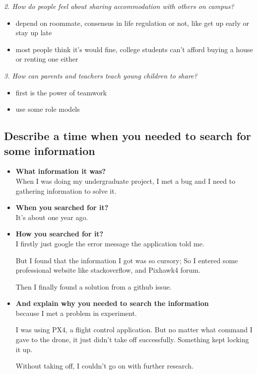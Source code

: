 \documentclass[conference]{IEEEtran}
\begin{document}
\textit{2. How do people feel about sharing accommodation with others on campus?}
\begin{itemize}
    \item depend on roommate, consensus in life regulation or not, like get up early or stay up late
    \item most people think it's would fine, college students can't afford buying a house or renting one either
\end{itemize}

\textit{3. How can parents and teachers teach young children to share?}
\begin{itemize}
    \item first is the power of teamwork
    \item use some role models
\end{itemize}

\subsection{Describe a time when you needed to search for some information}
\begin{itemize}
    \item \textbf{What information it was?}\\
    When I was doing my undergraduate project, I met a bug and I need to gathering information to solve it.
    \item \textbf{When you searched for it?}\\
    It's about one year ago.
    \item \textbf{How you searched for it?}\\
    I firstly just google the error message the application told me.

    But I found that the information I got was so cursory;
    So I entered some professional website like stackoverflow, and Pixhawk4 forum.

    Then I finally found a solution from a github issue. 
    \item \textbf{And explain why you needed to search the information}\\
    because I met a problem in experiment.

    I was using PX4, a flight control application. But no matter what command I gave to the drone, 
    it just didn't take off successfully.
    Something kept locking it up.

    Without taking off, I couldn't go on with further research.
\end{itemize}
\end{document}
